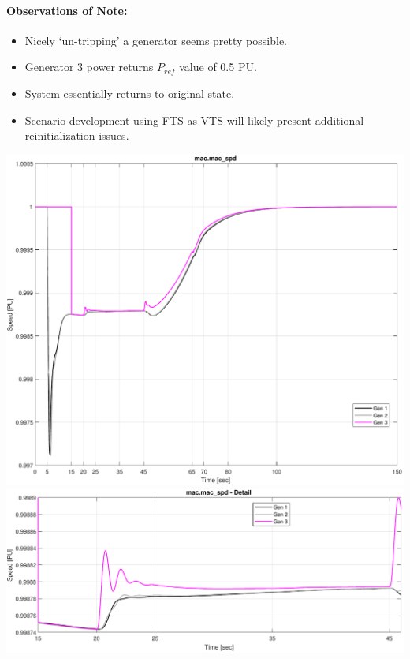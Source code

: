 \documentclass[12pt]{article}
\begin{document}
\paragraph{Observations of Note:}
\begin{itemize}
\item Nicely `un-tripping' a generator seems pretty possible.
\item Generator 3 power returns $P_{ref}$ value of 0.5 PU.
\item System essentially returns to original state.
\item Scenario development using FTS as VTS will likely present additional reinitialization issues.
\end{itemize}

\pagebreak
\includegraphics[width=\linewidth]{combinedSpeed}
\includegraphics[width=\linewidth]{combinedSpeedDetail}
\end{document}
